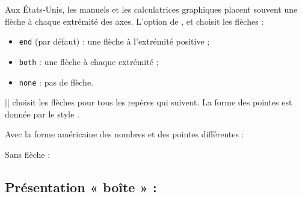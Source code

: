 Aux États-Unis, les manuels et les calculatrices graphiques placent souvent une flèche à chaque extrémité des axes. L'option  de ,  et  choisit les flèches :
\begin{itemize}
  \item \texttt{end} (par défaut) : une flèche à l'extrémité positive ;
  \item \texttt{both} : une flèche à chaque extrémité ;
  \item \texttt{none} : pas de flèche.
\end{itemize}
|| choisit les flèches pour tous les repères qui suivent. La forme des pointes est donnée par le style .

\begin{tkzexample}[latex=7cm]
\end{tkzexample}

Avec la forme américaine des nombres et des pointes différentes :

\begin{tkzexample}[latex=7cm]
\end{tkzexample}

Sans flèche :

\begin{tkzexample}[latex=7cm]
\end{tkzexample}

\newpage
\subsection{Présentation « boîte » : }\label{sec:box}

